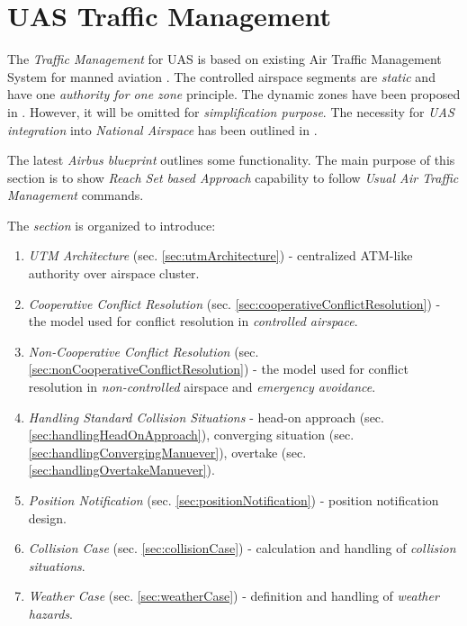\cleardoublepage
\section{UAS Traffic Management}\label{sec:UASTrafficManagement}

\noindent The \emph{Traffic Management} for UAS is based on existing Air Traffic Management System for manned aviation \cite{icao4444}. The controlled airspace segments are \emph{static} and have one \emph{authority for one zone} principle. The dynamic zones have been proposed in \cite{gerdes2016dynamic}. However, it will be omitted for \emph{simplification purpose}. The necessity for \emph{UAS integration} into \emph{National Airspace} has been outlined in \cite{spriesterbach2013unmanned}.

The latest \emph{Airbus blueprint} \cite{airbusUTM2018blueprint} outlines some functionality. The main purpose of this section is to show \emph{Reach Set based Approach} capability to follow \emph{Usual Air Traffic Management} commands.

The \emph{section} is organized to introduce:
\begin{enumerate}
    \item \emph{UTM Architecture} (sec. \ref{sec:utmArchitecture}) - centralized ATM-like authority over airspace cluster.
    
    \item \emph{Cooperative Conflict Resolution} (sec. \ref{sec:cooperativeConflictResolution}) - the model used for conflict resolution in \emph{controlled airspace}.
    
    \item \emph{Non-Cooperative Conflict Resolution} (sec. \ref{sec:nonCooperativeConflictResolution})  - the model used for conflict resolution in \emph{non-controlled} airspace and \emph{emergency avoidance}.
    
    \item \emph{Handling Standard Collision Situations} - head-on approach (sec. \ref{sec:handlingHeadOnApproach}), converging situation (sec. \ref{sec:handlingConvergingManuever}), overtake (sec. \ref{sec:handlingOvertakeManuever}).
    
    \item \emph{Position Notification} (sec. \ref{sec:positionNotification}) - position notification design.
    
    \item \emph{Collision Case} (sec. \ref{sec:collisionCase}) - calculation and handling of \emph{collision situations}.
    
    \item \emph{Weather Case} (sec. \ref{sec:weatherCase}) - definition and handling of \emph{weather hazards}.
\end{enumerate}